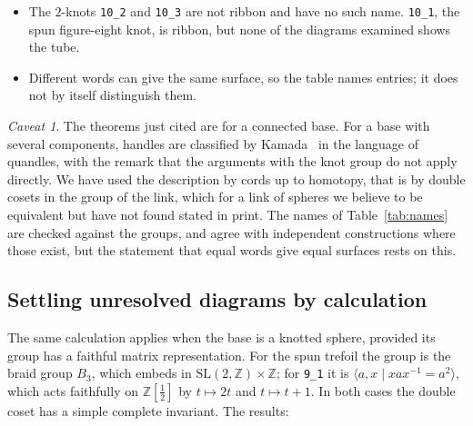 \documentclass[11pt]{amsart}
\newcommand{\Z}{\mathbb{Z}}
\newcommand{\lab}[1]{\texttt{#1}}
\newcommand{\inv}{^{-1}}
\theoremstyle{plain}
\theoremstyle{remark}
\newtheorem*{caveat}{Caveat}
\begin{document}
\begin{itemize}[leftmargin=*]
$\mathrm{PSL}(2,7)$ and affine groups up to order $1640$. The identification is an inference from the
published classification, not a computation. What has been computed is that the two groups are
isomorphic by a map, from the group of $R(bab\inv a\inv)$ to that of $R(bab\inv a)$, taking the meridian to its inverse: $a\mapsto a\inv$, $b\mapsto (b\inv a)\,b\inv(a\inv b)$,
with inverse $a\mapsto a\inv$, $b\mapsto (a\inv ba)\,b\inv(a\inv b\inv a)$. The maps were found by a separate
audit of this work; we checked them by rewriting each identity to the empty word with the relator.
\item The $2$-knots \lab{10\_2} and \lab{10\_3} are not ribbon and have no such name. \lab{10\_1}, the
spun figure-eight knot, is ribbon, but none of the diagrams examined shows the tube.
\item Different words can give the same surface, so the table names entries; it does not by itself
distinguish them.
\end{itemize}

\begin{caveat}
The theorems just cited are for a connected base. For a base with several components, handles are
classified by Kamada~\cite{K20} in the language of quandles, with the remark that the arguments with the
knot group do not apply directly. We have used the description by cords up to homotopy, that is by double
cosets in the group of the link, which for a link of spheres we believe to be equivalent but have not
found stated in print. The names of Table~\ref{tab:names} are checked against the groups, and agree with
independent constructions where those exist, but the statement that equal words give equal surfaces
rests on this.
\end{caveat}

\subsection{Settling unresolved diagrams by calculation}

The same calculation applies when the base is a knotted sphere, provided its group has a faithful matrix
representation. For the spun trefoil the group is the braid group $B_3$, which embeds in
$\mathrm{SL}(2,\Z)\times\Z$; for \lab{9\_1} it is $\langle a,x\mid xax\inv=a^2\rangle$, which acts
faithfully on $\Z[\tfrac12]$ by $t\mapsto 2t$ and $t\mapsto t+1$. In both cases the double coset has a
simple complete invariant. The results:
\end{document}
